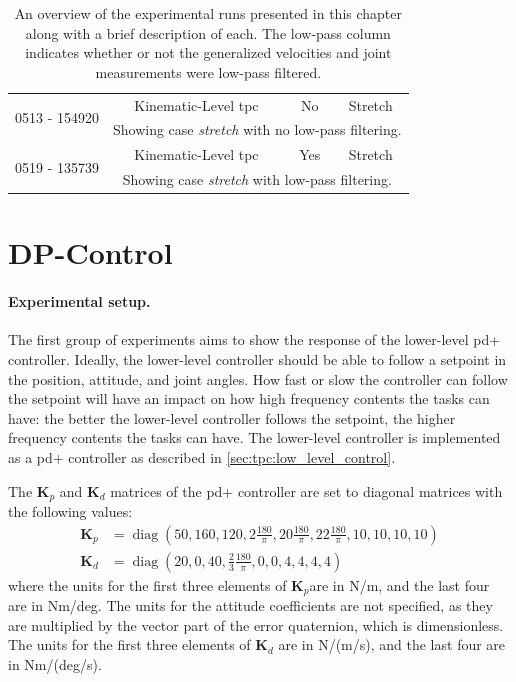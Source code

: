 \begin{table}[!ht]
\begin{tabular}{|c|c|c|c|}
        \multirow{2}{*}{0513 - 154920} & Kinematic-Level \gls{tpc} & No & Stretch \\ \cline{2-4}
        & \multicolumn{3}{p{0.75\linewidth}|}{Showing case \textit{stretch} with no low-pass filtering.} \\ \hline
        \multirow{2}{*}{0519 - 135739} & Kinematic-Level \gls{tpc} & Yes & Stretch \\ \cline{2-4}
        & \multicolumn{3}{p{0.75\linewidth}|}{Showing case \textit{stretch} with low-pass filtering.} \\ \hline
    \end{tabular}
    \caption[An overview of the experimental runs]{An overview of the experimental
    runs presented in this chapter along with a brief description of each.
    The low-pass column indicates whether or not the generalized velocities and joint measurements were low-pass filtered.}
    \label{tab:eelume:experimental-runs}
\end{table}

\section{DP-Control}

\paragraph{Experimental setup.}
The first group of experiments aims to show the response of the lower-level \gls{pd+} controller.
Ideally, the lower-level controller should be able to follow a setpoint
in the position, attitude, and joint angles. How fast or slow the controller can follow
the setpoint will have an impact on how high frequency contents the tasks can have:
the better the lower-level controller follows the setpoint, the higher frequency contents
the tasks can have. The lower-level controller is implemented as a \gls{pd+} controller
as described in \autoref{sec:tpc:low_level_control}.

The \(\bm{K}_p\) and \(\bm{K}_d\) matrices of the \gls{pd+} controller are set to
diagonal matrices with the following values:
\begin{subequations}
\begin{align}
    \bm{K}_p &= \operatorname{diag}\left( 50, 160, 120, 2 \frac{180}{\pi}, 20 \frac{180}{\pi}, 22 \frac{180}{\pi}, 10, 10, 10, 10 \right) \\
    \bm{K}_d &= \operatorname{diag}\left( 20, 0, 40, \frac{2}{3} \frac{180}{\pi}, 0, 0, 4, 4, 4, 4 \right)
\end{align}
\end{subequations}
where the units for the first three elements of \(\bm{K}_p\)are in N/m, and the last four are in Nm/deg.
The units for the attitude coefficients are not specified, as they are multiplied by the
vector part of the error quaternion, which is dimensionless. The units for the first three elements
of \(\bm{K}_d\) are in N/(m/s), and the last four are in Nm/(deg/s).

